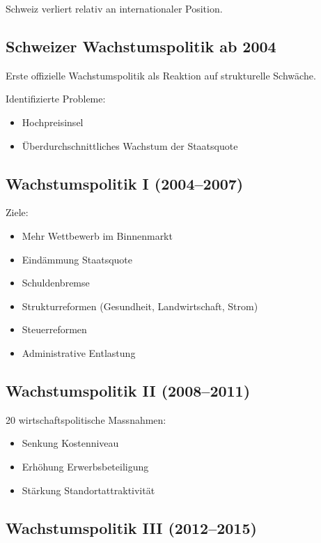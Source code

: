 Schweiz verliert relativ an internationaler Position.

\subsection{Schweizer Wachstumspolitik ab 2004}

Erste offizielle Wachstumspolitik als Reaktion auf strukturelle Schwäche.

Identifizierte Probleme:

\begin{itemize}
    \item Hochpreisinsel
    \item Überdurchschnittliches Wachstum der Staatsquote
\end{itemize}

\subsection{Wachstumspolitik I (2004–2007)}

Ziele:

\begin{itemize}
    \item Mehr Wettbewerb im Binnenmarkt
    \item Eindämmung Staatsquote
    \item Schuldenbremse
    \item Strukturreformen (Gesundheit, Landwirtschaft, Strom)
    \item Steuerreformen
    \item Administrative Entlastung
\end{itemize}

\subsection{Wachstumspolitik II (2008–2011)}

20 wirtschaftspolitische Massnahmen:

\begin{itemize}
    \item Senkung Kostenniveau
    \item Erhöhung Erwerbsbeteiligung
    \item Stärkung Standortattraktivität
\end{itemize}

\subsection{Wachstumspolitik III (2012–2015)}

